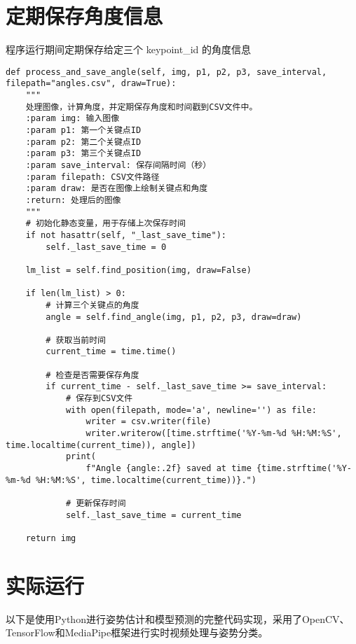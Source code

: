 \section{定期保存角度信息}

程序运行期间定期保存给定三个 keypoint\_id 的角度信息

\begin{lstlisting}
def process_and_save_angle(self, img, p1, p2, p3, save_interval, filepath="angles.csv", draw=True):
    """
    处理图像，计算角度，并定期保存角度和时间戳到CSV文件中。
    :param img: 输入图像
    :param p1: 第一个关键点ID
    :param p2: 第二个关键点ID
    :param p3: 第三个关键点ID
    :param save_interval: 保存间隔时间（秒）
    :param filepath: CSV文件路径
    :param draw: 是否在图像上绘制关键点和角度
    :return: 处理后的图像
    """
    # 初始化静态变量，用于存储上次保存时间
    if not hasattr(self, "_last_save_time"):
        self._last_save_time = 0

    lm_list = self.find_position(img, draw=False)

    if len(lm_list) > 0:
        # 计算三个关键点的角度
        angle = self.find_angle(img, p1, p2, p3, draw=draw)

        # 获取当前时间
        current_time = time.time()

        # 检查是否需要保存角度
        if current_time - self._last_save_time >= save_interval:
            # 保存到CSV文件
            with open(filepath, mode='a', newline='') as file:
                writer = csv.writer(file)
                writer.writerow([time.strftime('%Y-%m-%d %H:%M:%S', time.localtime(current_time)), angle])
            print(
                f"Angle {angle:.2f} saved at time {time.strftime('%Y-%m-%d %H:%M:%S', time.localtime(current_time))}.")

            # 更新保存时间
            self._last_save_time = current_time

    return img
\end{lstlisting}

\section{实际运行}

以下是使用Python进行姿势估计和模型预测的完整代码实现，采用了OpenCV、TensorFlow和MediaPipe框架进行实时视频处理与姿势分类。

